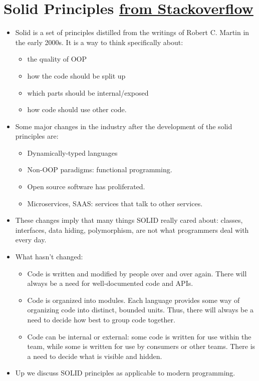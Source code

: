 \documentclass{report}
\begin{document}
\chapter{Solid Principles \href{https://stackoverflow.blog/2021/11/01/why-solid-principles-are-still-the-foundation-for-modern-software-architecture/}{from Stackoverflow}}
\begin{itemize}
\item Solid is a set of principles distilled from the writings of Robert C. Martin in the early 2000s. It is a way to think specifically about:
\begin{itemize}
    \item the quality of OOP
    \item how the code should be split up
    \item which parts should be internal/exposed
    \item how code should use other code.
\end{itemize}
\item Some major changes in the industry after the development of the solid principles are:
\begin{itemize}
    \item Dynamically-typed languages
    \item Non-OOP paradigms: functional programming.
    \item Open source software has proliferated.
    \item Microservices, SAAS: services that talk to other services.
\end{itemize}
\item These changes imply that many things SOLID really cared about: classes, interfaces, data hiding, polymorphism, are not what programmers deal with every day.
\item What hasn't changed:
\begin{itemize}
\item Code is written and modified by people over and over again. There will always be a need for well-documented code and APIs.
\item Code is organized into modules. Each language provides some way of organizing code into distinct, bounded units. Thus, there will always be a need to decide how best to group code together.
\item Code can be internal or external: some code is written for use within the team, while some is written for use by consumers or other teams. There is a need to decide what is visible and hidden.
\end{itemize}
\item Up we discuss SOLID principles as applicable to modern programming.
\end{itemize}
\end{document}
